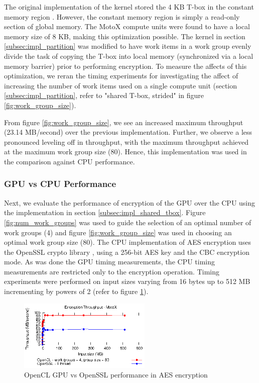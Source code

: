 \documentclass[conference,10pt]{IEEEtran}
\begin{document}
The original implementation of the kernel stored the 4 KB T-box in the constant memory region 
\cite{opencl_impl}.  However, the constant memory region is simply a read-only section of global memory.  
The MotoX compute units were found to have a local memory size of 8 KB, making this optimization possible.  
The kernel in section \ref{subsec:impl_partition} was modified to have work items in a work group evenly 
divide the task of copying the T-box into local memory (synchronized via a local memory barrier) prior to 
performing encryption.  To measure the affects of this optimization, we reran the timing experiments for 
investigating the affect of increasing the number of work items used on a single compute unit (section 
\ref{subsec:impl_partition}, refer to "shared T-box, strided" in figure \ref{fig:work_group_size}). 

From figure \ref{fig:work_group_size}, we see an increased maximum throughput (23.14 MB/second) over the 
previous implementation.  Further, we observe a less pronounced leveling off in throughput, with the maximum 
throughput achieved at the maximum work group size (80). Hence, this implementation was used in the 
comparison against CPU performance.

\subsubsection{GPU vs CPU Performance}
\label{subsec:gpu_vs_cpu}

Next, we evaluate the performance of encryption of the GPU over the CPU using the implementation in section 
\ref{subsec:impl_shared_tbox}.   Figure \ref{fig:num_work_groups} was used to guide the selection of an 
optimal number of work groups (4) and figure \ref{fig:work_group_size} was used in choosing an optimal work 
group size (80).  The CPU implementation of AES encryption uses the OpenSSL crypto library \cite{openssl}, 
using a 256-bit AES key and the CBC encryption mode.  As was done the GPU timing measurements, the CPU 
timing measurements are restricted only to the encryption operation.  Timing experiments were performed on 
input sizes varying from 16 bytes up to 512 MB incrementing by powers of 2 (refer to figure 
\ref{fig:opencl_vs_cpu}).

\begin{figure}[!t]
\centering
\includegraphics[width=2.5in]{../final/motox/4.2/opencl_sizes_vs_cpu_sizes.shared_tbox_4G_80L.cpu_1thread.eps}
\caption{OpenCL GPU vs OpenSSL performance in AES encryption}
\label{fig:opencl_vs_cpu}
\end{figure}
\end{document}
